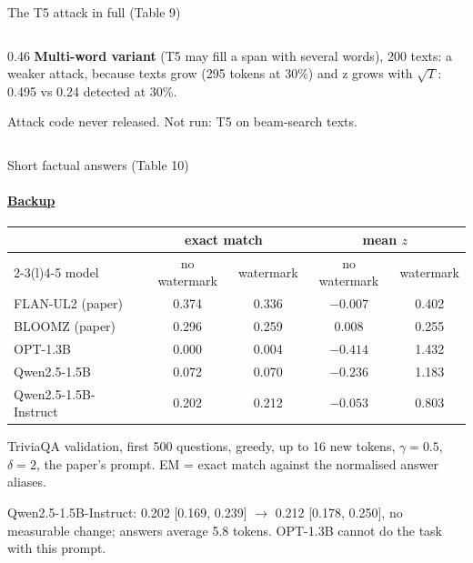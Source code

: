 \documentclass[aspectratio=169,10pt,t]{beamer}
\newcommand{\key}[1]{\textcolor{calblue}{\textbf{#1}}}
\newcommand{\quiet}[1]{\textcolor{muted}{#1}}
\begin{document}
\begin{frame}[label=b8]{The T5 attack in full (Table 9)}
\begin{columns}[T,onlytextwidth]
\begin{column}{0.46\textwidth}
      \key{Multi-word variant} (T5 may fill a span with several words), 200 texts: a weaker attack, because texts grow (295 tokens at 30\%) and z grows with $\sqrt{T}$: 0.495 vs 0.24 detected at 30\%.\par\vspace{0.3em}
      \quiet{\scriptsize Attack code never released. Not run: T5 on beam-search texts.}
    \end{column}
  \end{columns}
\end{frame}

\begin{frame}[label=b9]{Short factual answers (Table 10)}
  \framesubtitle{\hyperlink{b0}{Backup}}
  \begin{center}
  \begin{tabular}{@{}lcccc@{}}
    \toprule
     & \multicolumn{2}{c}{exact match} & \multicolumn{2}{c}{mean $z$} \\
    \cmidrule(lr){2-3}\cmidrule(l){4-5}
    model & no watermark & watermark & no watermark & watermark \\
    \midrule
    FLAN-UL2 (paper) & 0.374 & 0.336 & $-0.007$ & 0.402 \\
    BLOOMZ (paper) & 0.296 & 0.259 & 0.008 & 0.255 \\
    \midrule
    OPT-1.3B & 0.000 & 0.004 & $-0.414$ & 1.432 \\
    Qwen2.5-1.5B & 0.072 & 0.070 & $-0.236$ & 1.183 \\
    Qwen2.5-1.5B-Instruct & 0.202 & 0.212 & $-0.053$ & 0.803 \\
    \bottomrule
  \end{tabular}
  \end{center}
  \vspace{0.4em}
  TriviaQA validation, first 500 questions, greedy, up to 16 new tokens, $\gamma = 0.5$, $\delta = 2$, the paper's prompt. EM = exact match against the normalised answer aliases.\par\vspace{0.4em}
  Qwen2.5-1.5B-Instruct: 0.202 [0.169, 0.239] $\to$ 0.212 [0.178, 0.250], no measurable change; answers average 5.8 tokens. OPT-1.3B cannot do the task with this prompt.
\end{frame}
\end{document}
